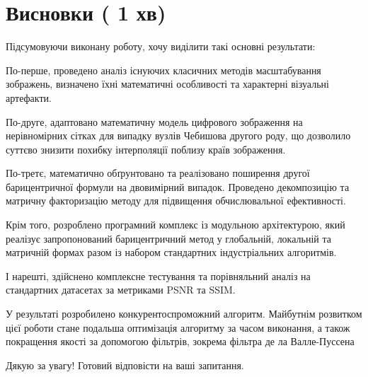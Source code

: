 \documentclass[12pt,a4paper]{article}
\begin{document}
	\section*{Висновки ( 1 хв)}
Підсумовуючи виконану роботу, хочу виділити такі основні результати:

По-перше, проведено аналіз існуючих класичних методів масштабування зображень, визначено їхні математичні особливості та характерні візуальні артефакти.

По-друге, адаптовано математичну модель цифрового зображення на нерівномірних сітках для випадку вузлів Чебишова другого роду, що дозволило суттєво знизити похибку інтерполяції поблизу країв зображення.

По-третє, математично обґрунтовано та реалізовано поширення другої барицентричної формули на двовимірний випадок. Проведено декомпозицію та матричну факторизацію методу для підвищення обчислювальної ефективності.

Крім того, розроблено програмний комплекс із модульною архітектурою, який реалізує запропонований барицентричний метод у глобальній, локальній та матричній формах разом із набором стандартних індустріальних алгоритмів.

І нарешті, здійснено комплексне тестування та порівняльний аналіз на стандартних датасетах за метриками PSNR та SSIM.

У результаті розробилено конкурентоспроможний алгоритм. Майбутнім розвитком цієї роботи стане подальша оптимізація алгоритму за часом виконання, а також покращення якості за допомогою фільтрів, зокрема фільтра де ла Валле-Пуссена
	
	Дякую за увагу! Готовий відповісти на ваші запитання.
	
\end{document}
